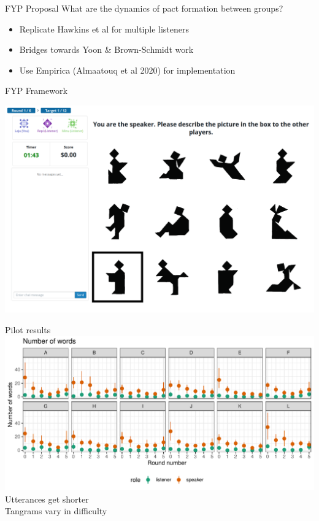 \documentclass[12pt, xcolor=beamer,table,usenames,dvipsnames, ignorenonframetext, ngerman,t]{beamer}
\begin{document}
%
\begin{frame}{FYP Proposal}
	What are the dynamics of pact formation between groups? \pause
	\begin{itemize}
		\item Replicate Hawkins et al for multiple listeners \pause
		\item Bridges towards Yoon \& Brown-Schmidt work \pause
		\item Use Empirica (Almaatouq et al 2020) for implementation
	\end{itemize}

\end{frame}

\begin{frame}{FYP Framework}

 \includegraphics[width=.9\textwidth]{images/interface.PNG}
\end{frame}

\begin{frame}{Pilot results}
\includegraphics[width=\textwidth]{images/words.pdf}
Utterances get shorter\\
Tangrams vary in difficulty
\end{frame}
\end{document}
